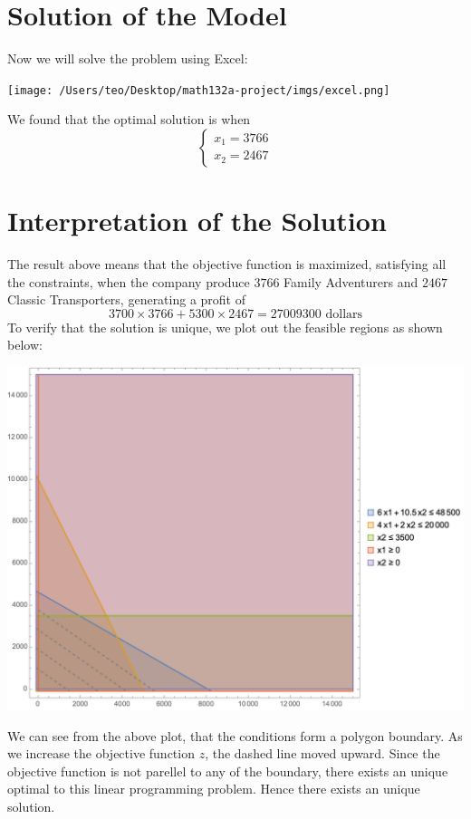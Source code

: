 \documentclass[
]{article}
\begin{document}
\hypertarget{solution-of-the-model}{%
\section{Solution of the Model}\label{solution-of-the-model}}

Now we will solve the problem using Excel:

\texttt{[image: /Users/teo/Desktop/math132a-project/imgs/excel.png]}

We found that the optimal solution is when \[
\begin{cases}
        x_1 = 3766\\ 
        x_2 = 2467
 \end{cases}
\]

\hypertarget{interpretation-of-the-solution}{%
\section{Interpretation of the
Solution}\label{interpretation-of-the-solution}}

The result above means that the objective function is maximized,
satisfying all the constraints, when the company produce \(3766\) Family
Adventurers and \(2467\) Classic Transporters, generating a profit of \[
3700 \times 3766 + 5300 \times 2467 = 27009300 \text{   dollars}
\] To verify that the solution is unique, we plot out the feasible
regions as shown below:

\includegraphics{imgs/plot1.png}

We can see from the above plot, that the conditions form a polygon
boundary. As we increase the objective function \(z\), the dashed line
moved upward. Since the objective function is not parellel to any of the
boundary, there exists an unique optimal to this linear programming
problem. Hence there exists an unique solution.
\end{document}
